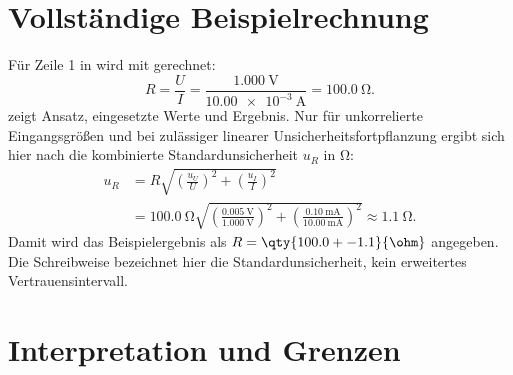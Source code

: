 \section{Vollständige Beispielrechnung}
Für Zeile 1 in  wird mit  gerechnet:
\begin{equation}
  R = \frac{U}{I}
    = \frac{\qty{1.000}{\volt}}{\qty{10.00e-3}{\ampere}}
    = \qty{100.0}{\ohm}.
  \label{eq:calculation}
\end{equation}
 zeigt Ansatz, eingesetzte Werte und Ergebnis.
Nur für unkorrelierte Eingangsgrößen und bei zulässiger linearer
Unsicherheitsfortpflanzung ergibt sich hier nach 
die kombinierte Standardunsicherheit $u_R$ in \unit{\ohm}:
\begin{equation}
  \begin{aligned}
    u_R &= R\sqrt{\left(\frac{u_U}{U}\right)^2
                    +\left(\frac{u_I}{I}\right)^2} \\
        &= \qty{100.0}{\ohm}
           \sqrt{\left(\frac{\qty{0.005}{\volt}}{\qty{1.000}{\volt}}\right)^2
                +\left(\frac{\qty{0.10}{\milli\ampere}}{\qty{10.00}{\milli\ampere}}\right)^2}
         \approx \qty{1.1}{\ohm}.
  \end{aligned}
  \label{eq:uncertainty}
\end{equation}
Damit wird das Beispielergebnis als
$R=\qty{100.0 +- 1.1}{\ohm}$ angegeben. Die Schreibweise bezeichnet hier
die Standardunsicherheit, kein erweitertes Vertrauensintervall.

\section{Interpretation und Grenzen}
